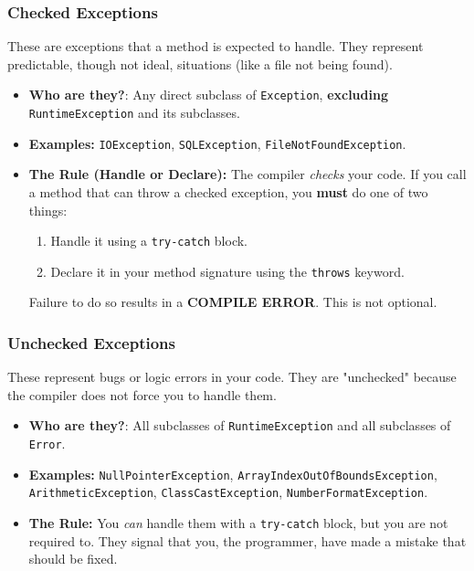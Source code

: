 \documentclass[12pt]{article}
\begin{document}
\begin{enumerate}[label=(\arabic*)]
\subsubsection{Checked Exceptions}
These are exceptions that a method is expected to handle. They represent predictable, though not ideal, situations (like a file not being found).
\begin{itemize}
    \item \textbf{Who are they?}: Any direct subclass of \texttt{Exception}, \textbf{excluding} \texttt{RuntimeException} and its subclasses.
    \item \textbf{Examples:} \texttt{IOException}, \texttt{SQLException}, \texttt{FileNotFoundException}.
    \item \textbf{The Rule (Handle or Declare):} The compiler \textit{checks} your code. If you call a method that can throw a checked exception, you \textbf{must} do one of two things:
    \begin{enumerate}
        \item Handle it using a \texttt{try-catch} block.
        \item Declare it in your method signature using the \texttt{throws} keyword.
    \end{enumerate}
    Failure to do so results in a \textbf{COMPILE ERROR}. This is not optional.
\end{itemize}

\subsubsection{Unchecked Exceptions}
These represent bugs or logic errors in your code. They are "unchecked" because the compiler does not force you to handle them.
\begin{itemize}
    \item \textbf{Who are they?}: All subclasses of \texttt{RuntimeException} and all subclasses of \texttt{Error}.
    \item \textbf{Examples:} \texttt{NullPointerException}, \texttt{ArrayIndexOutOfBoundsException}, \texttt{ArithmeticException}, \texttt{ClassCastException}, \texttt{NumberFormatException}.
    \item \textbf{The Rule:} You \textit{can} handle them with a \texttt{try-catch} block, but you are not required to. They signal that you, the programmer, have made a mistake that should be fixed.
\end{itemize}


\end{enumerate}
\end{document}
